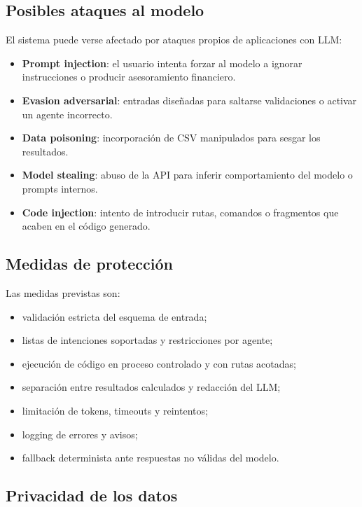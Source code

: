 \documentclass[11pt,a4paper]{article}
\begin{document}
\subsection{Posibles ataques al modelo}

El sistema puede verse afectado por ataques propios de aplicaciones con LLM:

\begin{itemize}
    \item \textbf{Prompt injection}: el usuario intenta forzar al modelo a ignorar instrucciones o producir asesoramiento financiero.
    \item \textbf{Evasion adversarial}: entradas dise\~nadas para saltarse validaciones o activar un agente incorrecto.
    \item \textbf{Data poisoning}: incorporaci\'on de CSV manipulados para sesgar los resultados.
    \item \textbf{Model stealing}: abuso de la API para inferir comportamiento del modelo o prompts internos.
    \item \textbf{Code injection}: intento de introducir rutas, comandos o fragmentos que acaben en el c\'odigo generado.
\end{itemize}

\subsection{Medidas de protecci\'on}

Las medidas previstas son:

\begin{itemize}
    \item validaci\'on estricta del esquema de entrada;
    \item listas de intenciones soportadas y restricciones por agente;
    \item ejecuci\'on de c\'odigo en proceso controlado y con rutas acotadas;
    \item separaci\'on entre resultados calculados y redacci\'on del LLM;
    \item limitaci\'on de tokens, timeouts y reintentos;
    \item logging de errores y avisos;
    \item fallback determinista ante respuestas no v\'alidas del modelo.
\end{itemize}

\subsection{Privacidad de los datos}
\end{document}
